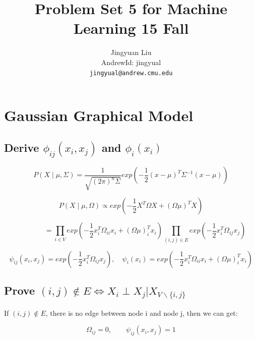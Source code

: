 \documentclass{article} %
\title{Problem Set 5 for Machine Learning 15 Fall}
\author{
Jingyuan Liu\\
AndrewId: jingyual\\
\texttt{jingyual@andrew.cmu.edu} \\
}
\begin{document}
\maketitle



\section{Gaussian Graphical Model}


\subsection{Derive $\phi_{ij} (x_i, x_j)$ and $\phi_i (x_i)$}

\begin{equation}
P(X \mid \mu, \Sigma) = \frac{1}{\sqrt{(2\pi)^n \Sigma}}
exp (-\frac{1}{2} (x-\mu)^T \Sigma^{-1} (x-\mu))
\end{equation}

\begin{equation}
P(X \mid \mu, \Omega) \propto exp (-\frac{1}{2} X^T \Omega X + (\Omega \mu)^T X)
\end{equation}

\begin{equation}
\qquad \qquad =
\prod_{i \in V} exp (-\frac{1}{2} x_i^T \Omega_{ii} x_i + (\Omega \mu)_i^T x_i)
\prod_{(i, j) \in E} exp( -\frac{1}{2} x_i^T \Omega_{ij} x_j)
\end{equation}

\begin{equation}
\psi_{ij} (x_i, x_j) =
exp( -\frac{1}{2} x_i^T \Omega_{ij} x_j)
, \quad
\psi_{i} (x_i) =
exp (-\frac{1}{2} x_i^T \Omega_{ii} x_i + (\Omega \mu)_i^T x_i)
\end{equation}


\subsection{Prove $(i,j ) \notin E \iff X_i \perp X_j | X_{V\backslash\{i,j\}}$}
If $(i, j) \notin E$, there is no edge between node i
and node j, then we can get:

\begin{equation}
\Omega_{ij} = 0, \qquad \psi_{ij} (x_i, x_j) = 1
\end{equation}
\end{document}
